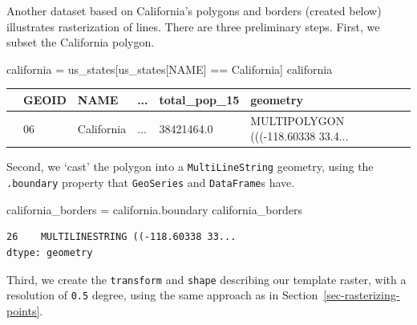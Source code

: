 \documentclass[
  letterpaper,
]{krantz}
\newenvironment{Shaded}{\begin{snugshade}}{\end{snugshade}}
\newcommand{\NormalTok}[1]{\textcolor[rgb]{0.00,0.23,0.31}{#1}}
\newcommand{\OperatorTok}[1]{\textcolor[rgb]{0.37,0.37,0.37}{#1}}
\newcommand{\StringTok}[1]{\textcolor[rgb]{0.13,0.47,0.30}{#1}}
\begin{document}
Another dataset based on California's polygons and borders (created
below) illustrates rasterization of lines. There are three preliminary
steps. First, we subset the California polygon.

\begin{Shaded}
\begin{Highlighting}[]
\NormalTok{california }\OperatorTok{=}\NormalTok{ us\_states[us\_states[}\StringTok{\textquotesingle{}NAME\textquotesingle{}}\NormalTok{] }\OperatorTok{==} \StringTok{\textquotesingle{}California\textquotesingle{}}\NormalTok{]}
\NormalTok{california}
\end{Highlighting}
\end{Shaded}

\begin{longtable}[]{@{}llllll@{}}
\toprule\noalign{}
& GEOID & NAME & ... & total\_pop\_15 & geometry \\
\midrule\noalign{}
\endhead
\bottomrule\noalign{}
\endlastfoot
26 & 06 & California & ... & 38421464.0 & MULTIPOLYGON (((-118.60338
33.4... \\
\end{longtable}

Second, we `cast' the polygon into a
\texttt{\textquotesingle{}MultiLineString\textquotesingle{}} geometry,
using the \texttt{.boundary} property that \texttt{GeoSeries} and
\texttt{DataFrame}s have.

\begin{Shaded}
\begin{Highlighting}[]
\NormalTok{california\_borders }\OperatorTok{=}\NormalTok{ california.boundary}
\NormalTok{california\_borders}
\end{Highlighting}
\end{Shaded}

\begin{verbatim}
26    MULTILINESTRING ((-118.60338 33...
dtype: geometry
\end{verbatim}

Third, we create the \texttt{transform} and \texttt{shape} describing
our template raster, with a resolution of \texttt{0.5} degree, using the
same approach as in Section~\ref{sec-rasterizing-points}.
\end{document}

